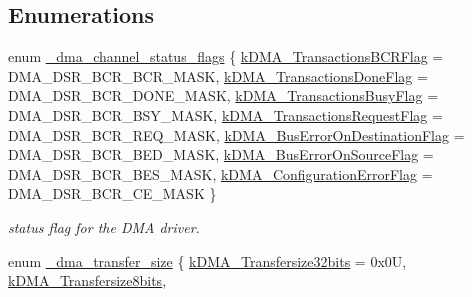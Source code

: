 \subsection*{Enumerations}
\begin{DoxyCompactItemize}
\item 
enum \mbox{\hyperlink{group__dma_ga36e753dba44ae75ed949766e19cc113d}{\+\_\+dma\+\_\+channel\+\_\+status\+\_\+flags}} \{ \newline
\mbox{\hyperlink{group__dma_gga36e753dba44ae75ed949766e19cc113da2d781b440cc4a6f79a1aceb6cf06cd07}{k\+D\+M\+A\+\_\+\+Transactions\+B\+C\+R\+Flag}} = D\+M\+A\+\_\+\+D\+S\+R\+\_\+\+B\+C\+R\+\_\+\+B\+C\+R\+\_\+\+M\+A\+SK, 
\mbox{\hyperlink{group__dma_gga36e753dba44ae75ed949766e19cc113dae890ef1d8993fb00d8d95b7f3feb7d39}{k\+D\+M\+A\+\_\+\+Transactions\+Done\+Flag}} = D\+M\+A\+\_\+\+D\+S\+R\+\_\+\+B\+C\+R\+\_\+\+D\+O\+N\+E\+\_\+\+M\+A\+SK, 
\mbox{\hyperlink{group__dma_gga36e753dba44ae75ed949766e19cc113da28dabe9487a26e3cacbce41b50752a70}{k\+D\+M\+A\+\_\+\+Transactions\+Busy\+Flag}} = D\+M\+A\+\_\+\+D\+S\+R\+\_\+\+B\+C\+R\+\_\+\+B\+S\+Y\+\_\+\+M\+A\+SK, 
\mbox{\hyperlink{group__dma_gga36e753dba44ae75ed949766e19cc113da20f859fbcfa07c2a4b4a5b273910fbc6}{k\+D\+M\+A\+\_\+\+Transactions\+Request\+Flag}} = D\+M\+A\+\_\+\+D\+S\+R\+\_\+\+B\+C\+R\+\_\+\+R\+E\+Q\+\_\+\+M\+A\+SK, 
\newline
\mbox{\hyperlink{group__dma_gga36e753dba44ae75ed949766e19cc113da38ba4fb9195801c5825242cdef9b582d}{k\+D\+M\+A\+\_\+\+Bus\+Error\+On\+Destination\+Flag}} = D\+M\+A\+\_\+\+D\+S\+R\+\_\+\+B\+C\+R\+\_\+\+B\+E\+D\+\_\+\+M\+A\+SK, 
\mbox{\hyperlink{group__dma_gga36e753dba44ae75ed949766e19cc113da3a89390c5832154e2da5e909f7655922}{k\+D\+M\+A\+\_\+\+Bus\+Error\+On\+Source\+Flag}} = D\+M\+A\+\_\+\+D\+S\+R\+\_\+\+B\+C\+R\+\_\+\+B\+E\+S\+\_\+\+M\+A\+SK, 
\mbox{\hyperlink{group__dma_gga36e753dba44ae75ed949766e19cc113da85f087aebd042b357f46dadda6bbce83}{k\+D\+M\+A\+\_\+\+Configuration\+Error\+Flag}} = D\+M\+A\+\_\+\+D\+S\+R\+\_\+\+B\+C\+R\+\_\+\+C\+E\+\_\+\+M\+A\+SK
 \}
\begin{DoxyCompactList}\small\item\em status flag for the D\+MA driver. \end{DoxyCompactList}\item 
enum \mbox{\hyperlink{group__dma_ga0b291003d51dd119595ed7aa7462a693}{\+\_\+dma\+\_\+transfer\+\_\+size}} \{ \mbox{\hyperlink{group__dma_gga0b291003d51dd119595ed7aa7462a693a969ae3a6429e54e8a301b26ecf3ab017}{k\+D\+M\+A\+\_\+\+Transfersize32bits}} = 0x0U, 
\mbox{\hyperlink{group__dma_gga0b291003d51dd119595ed7aa7462a693a14a03019f98a6f50dc1c4588d995f9d3}{k\+D\+M\+A\+\_\+\+Transfersize8bits}}, 

\end{DoxyCompactItemize}
